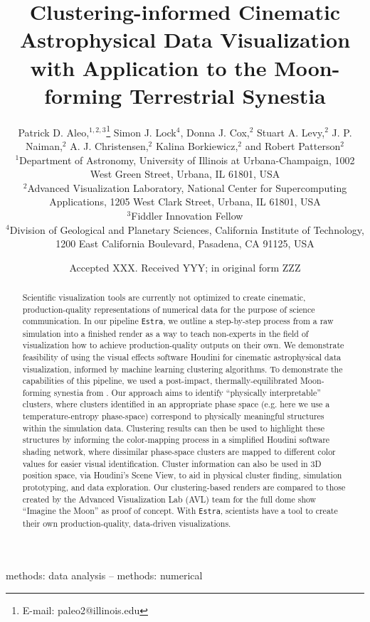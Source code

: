 \documentclass[fleqn,usenatbib,useAMS]{mnras}
\title[Clustering-informed Cinematic Astrophysical Data Visualization]{Clustering-informed Cinematic Astrophysical Data Visualization with Application to the Moon-forming Terrestrial Synestia}
\author[Patrick D. Aleo et al.]{
Patrick D. Aleo,$^{1,2,3}$\thanks{E-mail: paleo2@illinois.edu}
Simon J. Lock$^{4}$,
Donna J. Cox,$^{2}$
Stuart A. Levy,$^{2}$
J. P. Naiman,$^{2}$\newauthor
A. J. Christensen,$^{2}$
Kalina Borkiewicz,$^{2}$
and Robert Patterson$^{2}$
\\
$^{1}$Department of Astronomy, University of Illinois at Urbana-Champaign, 
1002 West Green Street, 
Urbana, IL 61801, USA\\
$^{2}$Advanced Visualization Laboratory, National Center for Supercomputing Applications, 
1205 West Clark Street,
Urbana, IL 61801, USA\\
$^{3}$Fiddler Innovation Fellow\\
$^{4}$Division of Geological and Planetary Sciences, California Institute of Technology, 
1200 East California Boulevard,
Pasadena, CA 91125, USA\\
}
\date{Accepted XXX. Received YYY; in original form ZZZ}
\begin{document}
\label{firstpage}
\pagerange{\pageref{firstpage}--\pageref{lastpage}}
\maketitle

\begin{abstract}

Scientific visualization tools are currently not optimized to create cinematic, production-quality representations of numerical data for the purpose of science communication. In our pipeline \texttt{Estra}, we outline a step-by-step process from a raw simulation into a finished render as a way to teach non-experts in the field of visualization how to achieve production-quality outputs on their own. We demonstrate feasibility of using the visual effects software Houdini for cinematic astrophysical data visualization, informed by machine learning clustering algorithms. To demonstrate the capabilities of this pipeline, we used a post-impact, thermally-equilibrated Moon-forming synestia from \cite{Lock18}. Our approach aims to identify ``physically interpretable'' clusters, where clusters identified in an appropriate phase space (e.g. here we use a temperature-entropy phase-space) correspond to physically meaningful structures within the simulation data. Clustering results can then be used to highlight these structures by informing the color-mapping process in a simplified Houdini software shading network, where dissimilar phase-space clusters are mapped to different color values for easier visual identification. Cluster information can also be used in 3D position space, via Houdini's Scene View, to aid in physical cluster finding, simulation prototyping, and data exploration. Our clustering-based renders are compared to those created by the Advanced Visualization Lab (AVL) team for the full dome show ``Imagine the Moon'' as proof of concept. With \texttt{Estra}, scientists have a tool to create their own production-quality, data-driven visualizations.

\end{abstract}

\begin{keywords}
methods: data analysis -- methods: numerical
\end{keywords}

\end{document}
